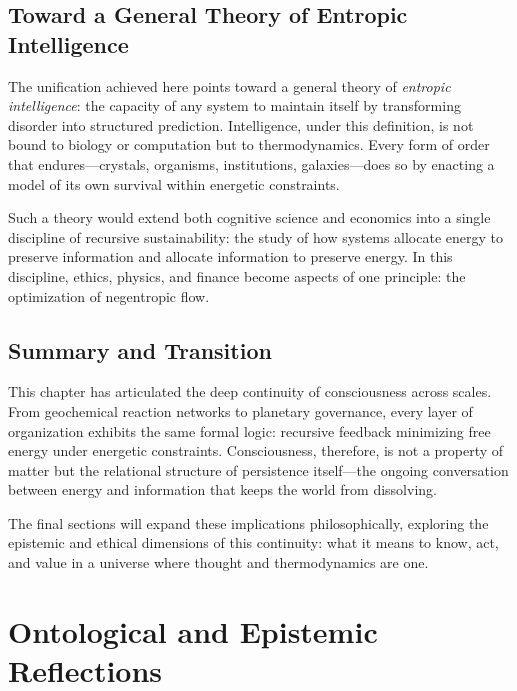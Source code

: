 \documentclass[11pt,a4paper]{article}
\begin{document}
\subsection{Toward a General Theory of Entropic Intelligence}

The unification achieved here points toward a general theory of \emph{entropic intelligence}: the capacity of any system to maintain itself by transforming disorder into structured prediction.  Intelligence, under this definition, is not bound to biology or computation but to thermodynamics.  Every form of order that endures—crystals, organisms, institutions, galaxies—does so by enacting a model of its own survival within energetic constraints.

Such a theory would extend both cognitive science and economics into a single discipline of recursive sustainability: the study of how systems allocate energy to preserve information and allocate information to preserve energy.  In this discipline, ethics, physics, and finance become aspects of one principle: the optimization of negentropic flow.

\subsection{Summary and Transition}

This chapter has articulated the deep continuity of consciousness across scales.  From geochemical reaction networks to planetary governance, every layer of organization exhibits the same formal logic: recursive feedback minimizing free energy under energetic constraints.  Consciousness, therefore, is not a property of matter but the relational structure of persistence itself—the ongoing conversation between energy and information that keeps the world from dissolving.

The final sections will expand these implications philosophically, exploring the epistemic and ethical dimensions of this continuity: what it means to know, act, and value in a universe where thought and thermodynamics are one.


\section{Ontological and Epistemic Reflections}
\label{sec:reflections}
\end{document}
